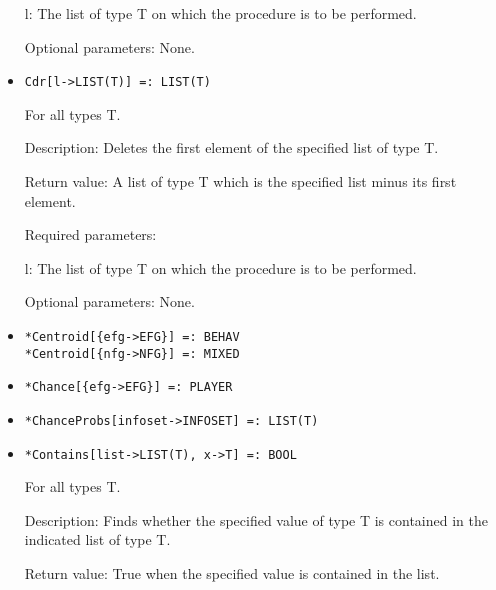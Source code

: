 \begin{itemize}
\bd
\item
[l:] The list of type T on which the procedure is to be performed.
\ed

\item
[Optional parameters:] None.
\ed

\item

\protect \large \begin{verbatim}
Cdr[l->LIST(T)] =: LIST(T)
\end{verbatim}\normalsize

For all types T.

\bd
\item
[Description:] Deletes the first element of the specified list of type
T.
\item 
[Return value:] A list of type T which is the specified list minus its
first element.
\item   
[Required parameters:]\hfil\null

\bd
\item
[l:] The list of type T on which the procedure is to be performed.
\ed
\item
[Optional parameters:] None.
\ed

\item
\protect \large \begin{verbatim} 
*Centroid[{efg->EFG}] =: BEHAV
*Centroid[{nfg->NFG}] =: MIXED
\end{verbatim}\normalsize

\item
\protect \large \begin{verbatim}
*Chance[{efg->EFG}] =: PLAYER
\end{verbatim}\normalsize

\item
\protect \large \begin{verbatim}
*ChanceProbs[infoset->INFOSET] =: LIST(T)
\end{verbatim}\normalsize

\item
\protect \large \begin{verbatim}
*Contains[list->LIST(T), x->T] =: BOOL
\end{verbatim}\normalsize

For all types T.

\bd
\item[Description:] Finds whether the specified value of type T is
contained in the indicated list of type T.
\item[Return value:] True when the specified value is contained in the
list.


\end{itemize}
